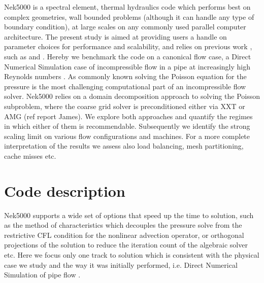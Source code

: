 \documentclass{sig-alternate}
\begin{document}
Nek5000 is a spectral element, thermal hydraulics code which performs best on
complex geometries, wall bounded problems (although it can handle any type of
boundary condition), at large scales on any commonly used parallel computer
architecture. The present study is aimed at providing users a handle on
parameter choices for performance and scalability, and relies on previous work ,
such as \cite{fischer:scaling} and \cite{tufo:terascale}. Hereby we benchmark
the code on a canonical flow case, a Direct Numerical Simulation case of
incompressible flow in a pipe at increasingly high Reynolds numbers
\cite{Khoury2013}. As commonly known solving the Poisson equation for the
pressure is the most challenging computational part of an incompressible flow
solver. Nek5000 relies on a domain decomposition approach to solving the Poisson
subproblem, where the coarse grid solver is preconditioned either via XXT \cite{Tufo2001151} or AMG (ref report James). We explore both approaches and quantify the regimes in which either of them is recommendable. Subsequently we identify the strong scaling limit on various flow configurations and machines. For a more complete interpretation of the results we assess also load balancing, mesh partitioning, cache misses etc. 

\section{Code description}
Nek5000 supports a wide set of options that speed up the time to solution, such
as the method of characteristics which decouples the pressure solve from the
restrictive CFL condition for the nonlinear advection operator, or orthogonal
projections of the solution to reduce the iteration count of the algebraic
solver etc. Here we focus only one track to solution which is consistent with
the physical case we study and the way it was initially performed, i.e. Direct Numerical Simulation of pipe flow \cite{Khoury2013}.
\end{document}
